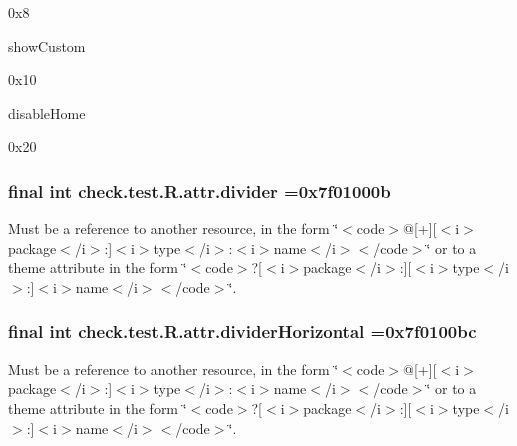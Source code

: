 0x8

{\ttfamily show\+Custom}

0x10

{\ttfamily disable\+Home}

0x20\hypertarget{classcheck_1_1test_1_1_r_1_1attr_abda5d171fa2d828b6f8ccf9f4fc707ea}{}
\subsubsection[{divider}]{\setlength{\rightskip}{0pt plus 5cm}final int check.\+test.\+R.\+attr.\+divider =0x7f01000b\hspace{0.3cm}{\ttfamily [static]}}\label{classcheck_1_1test_1_1_r_1_1attr_abda5d171fa2d828b6f8ccf9f4fc707ea}
Must be a reference to another resource, in the form \char`\"{}$<$code$>$@\mbox{[}+\mbox{]}\mbox{[}$<$i$>$package$<$/i$>$\+:\mbox{]}$<$i$>$type$<$/i$>$\+:$<$i$>$name$<$/i$>$$<$/code$>$\char`\"{} or to a theme attribute in the form \char`\"{}$<$code$>$?\mbox{[}$<$i$>$package$<$/i$>$\+:\mbox{]}\mbox{[}$<$i$>$type$<$/i$>$\+:\mbox{]}$<$i$>$name$<$/i$>$$<$/code$>$\char`\"{}. \hypertarget{classcheck_1_1test_1_1_r_1_1attr_a0331309a711a60ee0f22b5e718215f7a}{}
\subsubsection[{divider\+Horizontal}]{\setlength{\rightskip}{0pt plus 5cm}final int check.\+test.\+R.\+attr.\+divider\+Horizontal =0x7f0100bc\hspace{0.3cm}{\ttfamily [static]}}\label{classcheck_1_1test_1_1_r_1_1attr_a0331309a711a60ee0f22b5e718215f7a}
Must be a reference to another resource, in the form \char`\"{}$<$code$>$@\mbox{[}+\mbox{]}\mbox{[}$<$i$>$package$<$/i$>$\+:\mbox{]}$<$i$>$type$<$/i$>$\+:$<$i$>$name$<$/i$>$$<$/code$>$\char`\"{} or to a theme attribute in the form \char`\"{}$<$code$>$?\mbox{[}$<$i$>$package$<$/i$>$\+:\mbox{]}\mbox{[}$<$i$>$type$<$/i$>$\+:\mbox{]}$<$i$>$name$<$/i$>$$<$/code$>$\char`\"{}. \hypertarget{classcheck_1_1test_1_1_r_1_1attr_a9f8b7dc92e7e2974335ab3d696aa83cf}{}
